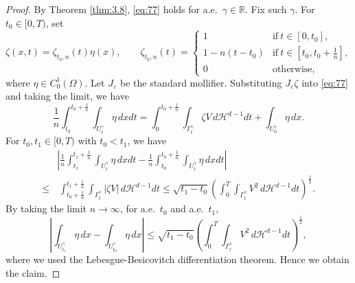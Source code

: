\documentclass{amsart}
\theoremstyle{definition}
\def\R{{\mathbb{R}}}
\begin{document}
\begin{proof}
By Theorem \ref{thm:3.8}, \eqref{eq:77} holds for a.e.\ $\gamma \in \R$. Fix such $\gamma$.
For $t_0 \in [0,T)$, set 
\[
\zeta (x,t)=\zeta_{t_0,n} (t) \eta (x), \qquad
\zeta_{t_0,n} (t) = 
\begin{cases}
1 & \text{if} \ t \in [0,t_0],\\
1-n(t-t_0) &\text{if} \ t \in [t_0, t_0 +\frac{1}{n}],\\
0 & \text{otherwise},
\end{cases}
\]
where $\eta \in C_0 ^1 (\Omega)$.
Let $J_\varepsilon$ be the standard mollifier. Substituting $J_\varepsilon \zeta$ into \eqref{eq:77} and taking the limit, we have
\begin{equation*}
\frac{1}{n} \int_{t_0} ^{t_0 +\frac{1}{n}} \int_{U_t ^\gamma} \eta \, dxdt
= 
\int_0 ^{t_0 +\frac{1}{n}} \int_{\Gamma_t ^\gamma} \zeta V  \, d\mathcal{H}^{d-1} dt
+ \int_{U_0 ^\gamma} \eta \, dx.
\end{equation*}
For $t_0, t_1 \in [0,T)$ with $t_0<t_1$, we have
\begin{equation*}
\begin{split}
&\left| \frac{1}{n} \int_{t_1} ^{t_1 +\frac{1}{n}} \int_{U_t ^\gamma} \eta \, dx dt
-
\frac{1}{n} \int_{t_0} ^{t_0 +\frac{1}{n}} \int_{U_t ^\gamma} \eta \, dx dt\right| \\
\leq & \,
\int_{t_0 +\frac{1}{n}} ^{t_1 +\frac{1}{n}} \int_{\Gamma_t ^\gamma} |\zeta V|  \, d\mathcal{H}^{d-1} dt
\leq \sqrt{t_1 -t_0}\left(
\int_{0} ^{T} \int_{\Gamma_t ^\gamma} V^2  \, d\mathcal{H}^{d-1} dt
\right)^{\frac{1}{2}}.
\end{split}
\end{equation*}
By taking the limit $n\to \infty$, for a.e.\ $t_0$ and a.e.\ $t_1$, 
\[
\left|
\int_{U_{t_1} ^\gamma} \eta \, dx
-
\int_{U_{t_0} ^\gamma} \eta \, dx
\right|
\leq 
\sqrt{t_1 -t_0}\left(
\int_{0} ^{T} \int_{\Gamma_t ^\gamma} V^2  \, d\mathcal{H}^{d-1} dt
\right)^{\frac{1}{2}},
\]
where we used the Lebesgue-Besicovitch differentiation theorem. Hence we obtain the claim.
\end{proof}
\end{document}
